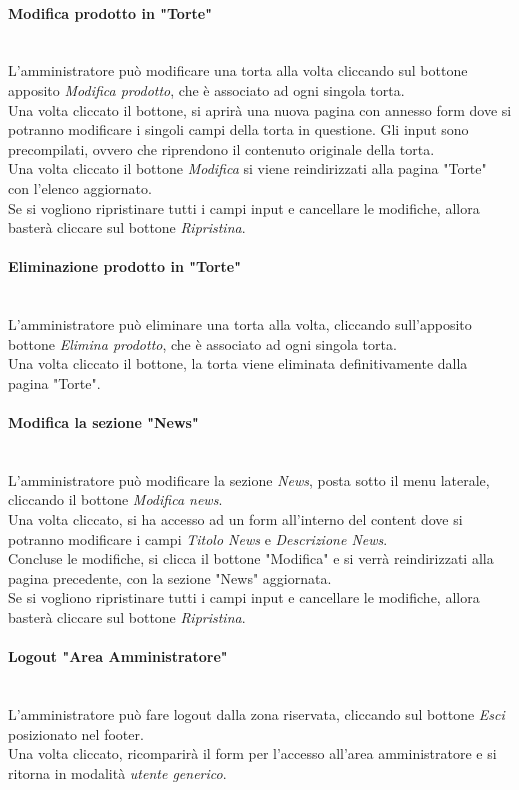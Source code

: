\paragraph{Modifica prodotto in "Torte"}\mbox{}\\
\label{par:ModT}
L'amministratore può modificare una torta alla volta cliccando sul bottone apposito \emph{Modifica prodotto}, che è associato ad ogni singola torta.\\ 
Una volta cliccato il bottone, si aprirà una nuova pagina con annesso form dove si potranno modificare i singoli campi della torta in questione. 
Gli input sono precompilati, ovvero che riprendono il contenuto originale della torta.\\
Una volta cliccato il bottone \emph{Modifica} si viene reindirizzati alla pagina "Torte" con l'elenco aggiornato.\\
Se si vogliono ripristinare tutti i campi input e cancellare le modifiche, allora basterà cliccare sul bottone \emph{Ripristina}.

\paragraph{Eliminazione prodotto in "Torte"}\mbox{}\\
\label{par:DelT}
L'amministratore può eliminare una torta alla volta, cliccando sull'apposito bottone \emph{Elimina prodotto}, che è associato ad ogni singola torta.\\ 
Una volta cliccato il bottone, la torta viene eliminata definitivamente dalla pagina "Torte".\\

\paragraph{Modifica la sezione "News"}\mbox{}\\
\label{par:ModN}
L'amministratore può modificare la sezione \emph{News}, posta sotto il menu laterale, cliccando il bottone \emph{Modifica news}.\\ 
Una volta cliccato, si ha accesso ad un form all'interno del content dove si potranno modificare i campi \emph{Titolo News} e \emph{Descrizione News}.\\
Concluse le modifiche, si clicca il bottone "Modifica" e si verrà reindirizzati alla pagina precedente, con la sezione "News" aggiornata.\\
Se si vogliono ripristinare tutti i campi input e cancellare le modifiche, allora basterà cliccare sul bottone \emph{Ripristina}.

\paragraph{Logout "Area Amministratore"}\mbox{}\\
\label{par:LogoutAA}
L'amministratore può fare logout dalla zona riservata, cliccando sul bottone \emph{Esci} posizionato nel footer.\\ 
Una volta cliccato, ricomparirà il form per l'accesso all'area amministratore e si ritorna in modalità \emph{utente generico}.\\